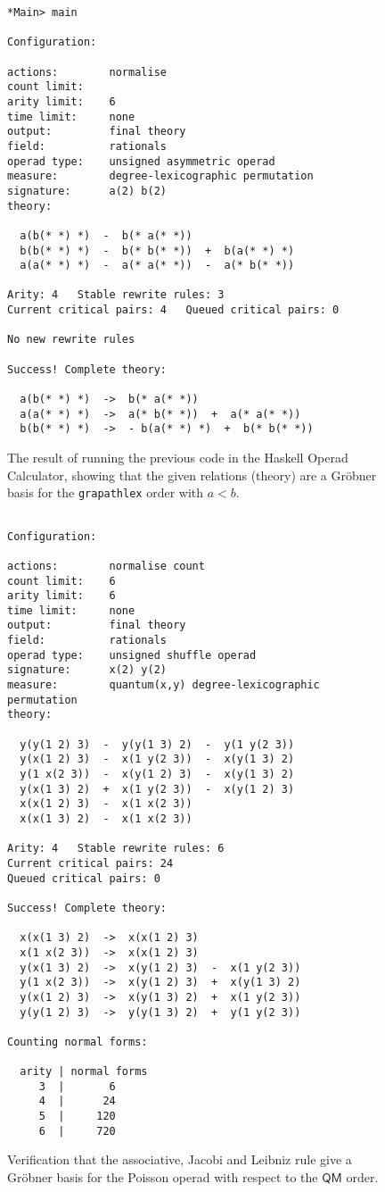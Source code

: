 \begin{figure}
\begin{verbatim}
*Main> main

Configuration:

actions:        normalise 
count limit:    
arity limit:    6
time limit:     none
output:         final theory
field:          rationals
operad type:    unsigned asymmetric operad
measure:        degree-lexicographic permutation 
signature:      a(2) b(2)
theory:

  a(b(* *) *)  -  b(* a(* *))
  b(b(* *) *)  -  b(* b(* *))  +  b(a(* *) *)
  a(a(* *) *)  -  a(* a(* *))  -  a(* b(* *))

Arity: 4   Stable rewrite rules: 3   
Current critical pairs: 4   Queued critical pairs: 0

No new rewrite rules

Success! Complete theory: 

  a(b(* *) *)  ->  b(* a(* *))
  a(a(* *) *)  ->  a(* b(* *))  +  a(* a(* *))
  b(b(* *) *)  ->  - b(a(* *) *)  +  b(* b(* *))
\end{verbatim}
\caption{The result of running the previous code in
the Haskell Operad Calculator, showing that the
given relations (theory) are a Gr\"obner basis for
the \texttt{grapathlex} order with $a<b$.}
\end{figure}


\begin{figure}

\begin{verbatim}

Configuration:

actions:        normalise count 
count limit:    6
arity limit:    6
time limit:     none
output:         final theory
field:          rationals
operad type:    unsigned shuffle operad
signature:      x(2) y(2)
measure:        quantum(x,y) degree-lexicographic permutation 
theory:

  y(y(1 2) 3)  -  y(y(1 3) 2)  -  y(1 y(2 3))
  y(x(1 2) 3)  -  x(1 y(2 3))  -  x(y(1 3) 2)
  y(1 x(2 3))  -  x(y(1 2) 3)  -  x(y(1 3) 2)
  y(x(1 3) 2)  +  x(1 y(2 3))  -  x(y(1 2) 3)
  x(x(1 2) 3)  -  x(1 x(2 3))
  x(x(1 3) 2)  -  x(1 x(2 3))

Arity: 4   Stable rewrite rules: 6   
Current critical pairs: 24   
Queued critical pairs: 0

Success! Complete theory: 

  x(x(1 3) 2)  ->  x(x(1 2) 3)
  x(1 x(2 3))  ->  x(x(1 2) 3)
  y(x(1 3) 2)  ->  x(y(1 2) 3)  -  x(1 y(2 3))
  y(1 x(2 3))  ->  x(y(1 2) 3)  +  x(y(1 3) 2)
  y(x(1 2) 3)  ->  x(y(1 3) 2)  +  x(1 y(2 3))
  y(y(1 2) 3)  ->  y(y(1 3) 2)  +  y(1 y(2 3))

Counting normal forms:

  arity | normal forms
     3  |       6
     4  |      24
     5  |     120
     6  |     720
\end{verbatim}
\caption{Verification that the associative, Jacobi and 
Leibniz rule give a Gr\"obner basis for the
Poisson operad with respect to the $\mathsf{QM}$ order.}
\end{figure}